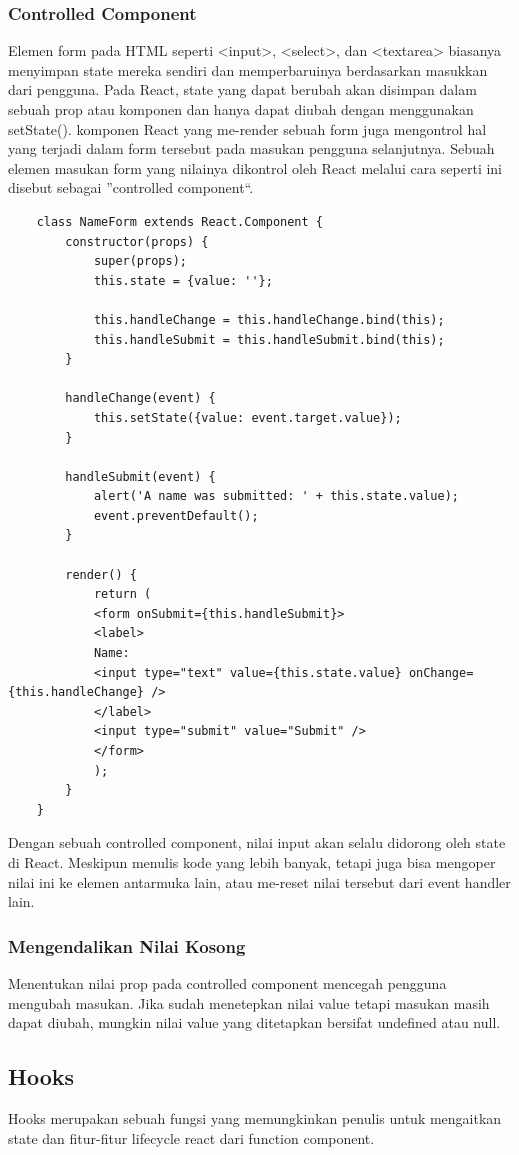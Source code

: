 \subsubsection{Controlled Component}
Elemen form pada HTML seperti <input>, <select>, dan <textarea> biasanya menyimpan state mereka sendiri dan memperbaruinya berdasarkan masukkan dari pengguna. Pada React, state yang dapat berubah akan disimpan dalam sebuah prop atau komponen dan hanya dapat diubah dengan menggunakan setState(). 
komponen React yang me-render sebuah form juga mengontrol hal yang terjadi dalam form tersebut pada masukan pengguna selanjutnya. Sebuah elemen masukan form yang nilainya dikontrol oleh React melalui cara seperti ini disebut sebagai ”controlled component“.
\begin{lstlisting}
	class NameForm extends React.Component {
		constructor(props) {
			super(props);
			this.state = {value: ''};
			
			this.handleChange = this.handleChange.bind(this);
			this.handleSubmit = this.handleSubmit.bind(this);
		}
		
		handleChange(event) {
			this.setState({value: event.target.value});
		}
		
		handleSubmit(event) {
			alert('A name was submitted: ' + this.state.value);
			event.preventDefault();
		}
		
		render() {
			return (
			<form onSubmit={this.handleSubmit}>
			<label>
			Name:
			<input type="text" value={this.state.value} onChange={this.handleChange} />
			</label>
			<input type="submit" value="Submit" />
			</form>
			);
		}
	}
\end{lstlisting}
Dengan sebuah controlled component, nilai input akan selalu didorong oleh state di React. Meskipun menulis kode yang lebih banyak, tetapi juga bisa mengoper nilai ini ke elemen antarmuka lain, atau me-reset nilai tersebut dari event handler lain.
\subsubsection{Mengendalikan Nilai Kosong}
Menentukan nilai prop pada controlled component mencegah pengguna mengubah masukan. Jika sudah menetepkan nilai value tetapi masukan masih dapat diubah, mungkin nilai value yang ditetapkan bersifat undefined atau null.

\subsection{Hooks}
Hooks merupakan sebuah fungsi yang memungkinkan penulis untuk mengaitkan state dan fitur-fitur lifecycle react dari function component.




